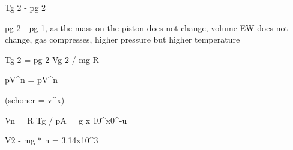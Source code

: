 Tg 2 - pg 2

pg 2 - pg 1, as the mass on the piston does not change, volume EW does not change, gas compresses, higher pressure but higher temperature

Tg 2 = pg 2 Vg 2 / mg R

pV^n = pV^n

(schoner = v^x)

Vn = R Tg / pA = g x 10^x0^-u

V2 - mg * n = 3.14x10^3